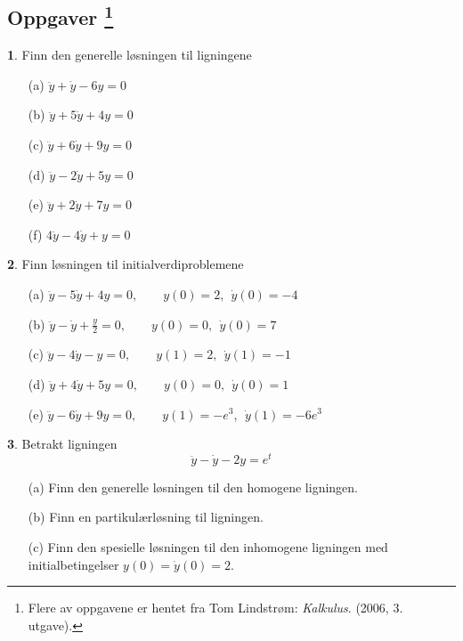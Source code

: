 \documentclass{article}
\theoremstyle{definition}
\newtheorem{oppg}{}
\theoremstyle{remark}
\begin{document}
\begin{multicols*}{2}
\newpage

\section*{Oppgaver \footnote{Flere av oppgavene er hentet fra Tom Lindstrøm: \textit{Kalkulus}. (2006, 3. utgave).}}

\begin{oppg}
  Finn den generelle løsningen til ligningene
  \begin{multicols*}{2}
    \begin{itemize}
      \item[(a)] $\ddot{y} + \dot{y} - 6 y = 0$
      \item[(b)] $\ddot{y} + 5\dot{y} + 4y = 0$
      \item[(c)] $\ddot{y} + 6\dot{y} + 9y = 0$
      \item[(d)] $\ddot{y} - 2\dot{y} + 5y = 0$
      \item[(e)] $\ddot{y} + 2\dot{y} + 7y = 0$
      \item[(f)] $4\ddot{y} - 4\dot{y} + y = 0$  
    \end{itemize}
  \end{multicols*}
\end{oppg}

\begin{oppg}
  Finn løsningen til initialverdiproblemene
  \begin{itemize}
    \item[(a)] $\ddot{y} - 5\dot{y} + 4y = 0, \qquad y(0) = 2,\ \ \dot{y}(0) = -4$
    \item[(b)] $\ddot{y} - \dot{y} + \frac{y}{2} = 0, \qquad y(0) = 0,\ \ \dot{y}(0) = 7$
    \item[(c)] $\ddot{y} - 4\dot{y} - y = 0, \qquad y(1) = 2,\ \ \dot{y}(1) = -1$
    \item[(d)] $\ddot{y} + 4\dot{y} + 5y = 0, \qquad y(0) = 0,\ \ \dot{y}(0) = 1$
    \item[(e)] $\ddot{y} - 6\dot{y} + 9y = 0, \qquad y(1) = -e^3,\ \ \dot{y}(1) = -6e^3$
  \end{itemize}
\end{oppg}

\begin{oppg}  
  Betrakt ligningen
  \begin{equation*}
    \ddot{y} - \dot{y} - 2y = e^t
  \end{equation*}
  \begin{itemize}
    \item[(a)] Finn den generelle løsningen til den homogene ligningen.
    \item[(b)] Finn en partikulærløsning til ligningen.
    \item[(c)] Finn den spesielle løsningen til den inhomogene ligningen med initialbetingelser $y(0) = \dot{y}(0) = 2$.
  \end{itemize}
\end{oppg}


\end{multicols*}
\end{document}
